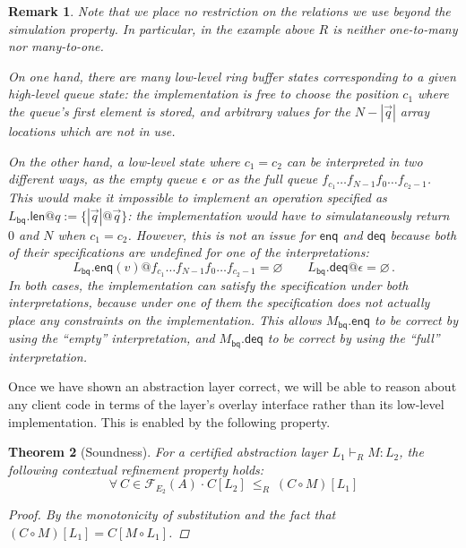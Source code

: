 \documentclass[11pt,oneside,draft]{book}
\newtheorem{theorem}{Theorem}[chapter]
\newtheorem{remark}[theorem]{Remark}
\theoremstyle{definition}
\newcommand{\kw}[1]{\ensuremath{ \mathsf{#1} }}
\newcommand{\bdot}{\boldsymbol{\cdot}}
\begin{document}
\begin{remark}
Note that we place no restriction
on the relations we use
beyond the simulation property.
In particular, in the example above
$R$ is neither one-to-many nor many-to-one.

On one hand,
there are many low-level ring buffer states corresponding to
a given high-level queue state:
the implementation is free to choose the position $c_1$
where the queue's first element is stored,
and arbitrary values for the $N - |\vec{q}|$
array locations which are not in use.

On the other hand,
a low-level state where $c_1 = c_2$
can be interpreted in two different ways,
as the empty queue $\epsilon$ or
as the full queue $f_{c_1} \ldots f_{N-1} f_0 \ldots f_{c_2 - 1}$.
This would make it impossible to implement
an operation specified as
$L_\kw{bq}.\kw{len}@q := \{ |\vec{q}|@\vec{q} \}$:
the implementation
would have to simulataneously
return $0$ and $N$
when $c_1 = c_2$.
However,
this is not an issue for $\kw{enq}$ and $\kw{deq}$ because
both of their specifications are undefined
for one of the interpretations:
\[
  L_\kw{bq}.\kw{enq}(v)@f_{c_1} \ldots f_{N-1} f_0 \ldots f_{c_2 - 1}
  =
  \varnothing
  \qquad
  L_\kw{bq}.\kw{deq}@\epsilon
  =
  \varnothing
  \,.
\]
In both cases,
the implementation can satisfy the specification
under both interpretations,
because under one of them
the specification does not actually place
any constraints on the implementation.
This allows
$M_\kw{bq}.\kw{enq}$ to be correct
by using the ``empty'' interpretation, and
$M_\kw{bq}.\kw{deq}$ to be correct
by using the ``full'' interpretation.
\end{remark}

Once we have shown an abstraction layer correct,
we will be able to reason about any client code
in terms of the layer's overlay interface
rather than its low-level implementation.
This is enabled by the following property.

\begin{theorem}[Soundness]
For a certified abstraction layer $L_1 \vdash_R M : L_2$,
the following \emph{contextual refinement} property holds:
\[
  \forall \: C \in \mathcal{F}_{E_2}(A) \: \bdot \:
  C[L_2] \: \le_R \: (C \circ M)[L_1]
\]
\begin{proof}
By the monotonicity of substitution and the fact that
$(C \circ M)[L_1] = C[M \circ L_1]$.
\end{proof}
\end{theorem}

\end{document}
